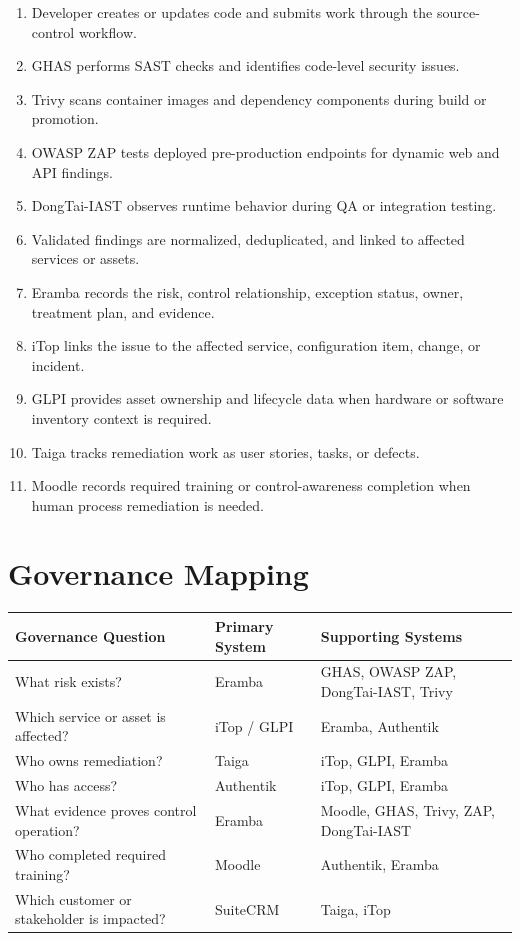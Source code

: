 \documentclass[10pt,letterpaper]{article}
\begin{document}
\begin{enumerate}
  \item Developer creates or updates code and submits work through the source-control workflow.
  \item GHAS performs SAST checks and identifies code-level security issues.
  \item Trivy scans container images and dependency components during build or promotion.
  \item OWASP ZAP tests deployed pre-production endpoints for dynamic web and API findings.
  \item DongTai-IAST observes runtime behavior during QA or integration testing.
  \item Validated findings are normalized, deduplicated, and linked to affected services or assets.
  \item Eramba records the risk, control relationship, exception status, owner, treatment plan, and evidence.
  \item iTop links the issue to the affected service, configuration item, change, or incident.
  \item GLPI provides asset ownership and lifecycle data when hardware or software inventory context is required.
  \item Taiga tracks remediation work as user stories, tasks, or defects.
  \item Moodle records required training or control-awareness completion when human process remediation is needed.
\end{enumerate}

\section{Governance Mapping}

\begin{tabularx}{\textwidth}{L{1.8in} Y Y}
\toprule
\textbf{Governance Question} & \textbf{Primary System} & \textbf{Supporting Systems} \\
\midrule
What risk exists? & Eramba & GHAS, OWASP ZAP, DongTai-IAST, Trivy \\
Which service or asset is affected? & iTop / GLPI & Eramba, Authentik \\
Who owns remediation? & Taiga & iTop, GLPI, Eramba \\
Who has access? & Authentik & iTop, GLPI, Eramba \\
What evidence proves control operation? & Eramba & Moodle, GHAS, Trivy, ZAP, DongTai-IAST \\
Who completed required training? & Moodle & Authentik, Eramba \\
Which customer or stakeholder is impacted? & SuiteCRM & Taiga, iTop \\
\bottomrule
\end{tabularx}
\end{document}
